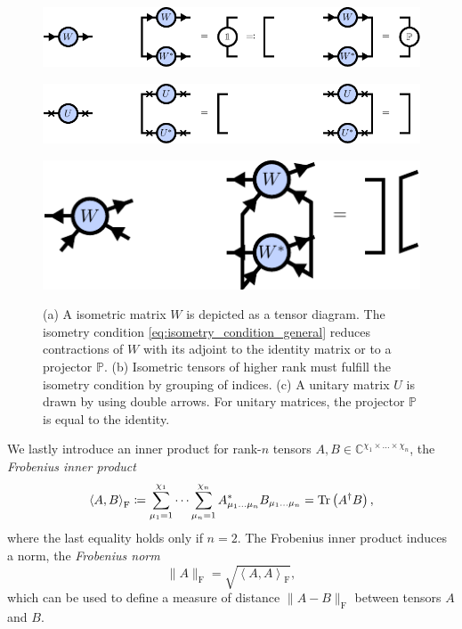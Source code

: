 \begin{figure}[h]
	\centering
	\subcaptionbox{\label{fig:basic_isometries_isometric_matrix}}
	{%
		\includegraphics[scale=1]{figures/tikz/Tensor_Networks/basic_isometries/basic_isometries_a.pdf}
	}
	\par\bigskip
	\subcaptionbox{\label{fig:basic_isometries_unitary_matrix}}
	{%
	\includegraphics[scale=1]{figures/tikz/Tensor_Networks/basic_isometries/basic_isometries_c.pdf}
	}
	\par\bigskip
	\subcaptionbox{\label{fig:basic_isometries_isometric_tensor}}
	{%
		\includegraphics[scale=1]{figures/tikz/Tensor_Networks/basic_isometries/basic_isometries_b.pdf}
	}
	\caption{(a) A isometric matrix $W$ is depicted as a tensor diagram. The isometry condition \eqref{eq:isometry_condition_general} reduces contractions of $W$ with its adjoint to the identity matrix or to a projector $\mathbb{P}$. (b) Isometric tensors of higher rank must fulfill the isometry condition by grouping of indices. (c) A unitary matrix $U$ is drawn by using double arrows. For unitary matrices, the projector $\mathbb{P}$ is equal to the identity.}
	\label{fig:isometries_and_unitaries_diagrams}
\end{figure}
We lastly introduce an inner product for rank-$n$ tensors $A, B \in \mathbb{C}^{\chi_1\times\dots\times\chi_n}$, the \textit{Frobenius inner product}
\begin{equation}
	\label{eq:frobenius_inner_product}
	\left\langle A, B\right\rangle_\text{F} \coloneqq \sum_{\mu_1=1}^{\chi_1} \dots \sum_{\mu_n=1}^{\chi_n} A_{\mu_1\dots\mu_n}^*B_{\mu_1\dots\mu_n} = \operatorname{Tr}\left(A^\dagger B\right),
\end{equation}
where the last equality holds only if $n = 2$. The Frobenius inner product induces a norm, the \textit{Frobenius norm}
\begin{equation}
	\label{eq:frobenius_norm}
	\lVert A\rVert_\text{F} = \sqrt{\left\langle A, A\right\rangle_\text{F}},
\end{equation}
which can be used to define a measure of distance $\lVert A-B\rVert_\text{F}$ between tensors $A$ and $B$.
